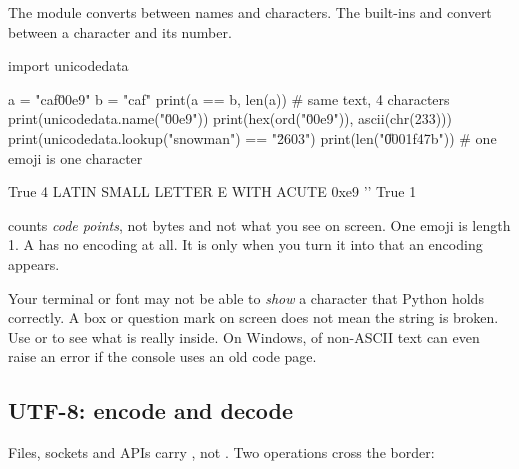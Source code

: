 The  module converts between names and characters. The built-ins 
and  convert between a character and its number.

\begin{pycode}
import unicodedata

a = "caf\u00e9"
b = "caf"
print(a == b, len(a))                       # same text, 4 characters
print(unicodedata.name("\u00e9"))
print(hex(ord("\u00e9")), ascii(chr(233)))
print(unicodedata.lookup("snowman") == "\u2603")
print(len("\U0001f47b"))                    # one emoji is one character
\end{pycode}
\begin{rawcode}
True 4
LATIN SMALL LETTER E WITH ACUTE
0xe9 ''
True
1
\end{rawcode}

\begin{typecheck}
 counts \emph{code points}, not bytes and not what you see on screen. One emoji is
length 1. A  has no encoding at all. It is only when you turn it into  that
an encoding appears.
\end{typecheck}

\begin{trap}
Your terminal or font may not be able to \emph{show} a character that Python holds correctly.
A box or question mark on screen does not mean the string is broken. Use  or
 to see what is really inside. On Windows,  of
non-ASCII text can even raise an error if the console uses an old code page.
\end{trap}

\subsection{UTF-8: encode and decode}

Files, sockets and APIs carry , not . Two operations cross the border:

\begin{center}
\end{center}

